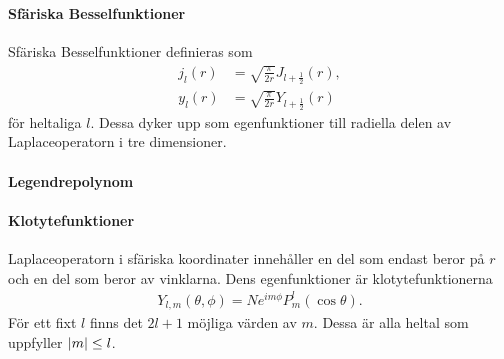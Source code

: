 \paragraph{Sfäriska Besselfunktioner}
Sfäriska Besselfunktioner definieras som
\begin{align*}
	j_{l}(r) &= \sqrt{\frac{\pi}{2r}}J_{l + \frac{1}{2}}(r), \\
	y_{l}(r) &= \sqrt{\frac{\pi}{2r}}Y_{l + \frac{1}{2}}(r)
\end{align*}
för heltaliga $l$. Dessa dyker upp som egenfunktioner till radiella delen av Laplaceoperatorn i tre dimensioner.

\paragraph{Legendrepolynom}

\paragraph{Klotytefunktioner}
Laplaceoperatorn i sfäriska koordinater innehåller en del som endast beror på $r$ och en del som beror av vinklarna. Dens egenfunktioner är klotytefunktionerna
\begin{align*}
	Y_{l, m}(\theta, \phi) = Ne^{im\phi}P_{m}^{l}(\cos{\theta}).
\end{align*}
För ett fixt $l$ finns det $2l + 1$ möjliga värden av $m$. Dessa är alla heltal som uppfyller $\abs{m} \leq l$.